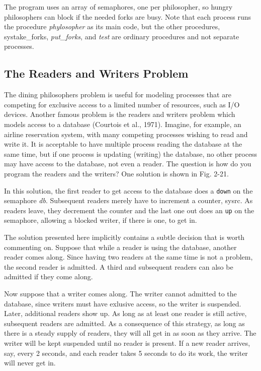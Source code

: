 \documentclass{book}
\newcommand {\sys} [1] {\textsl{#1}}
\newcommand {\cmd} [1] {\texttt{#1}}
\begin{document}
The program uses an array of semaphores, one per philosopher, so hungry philosophers can block if the needed forks are busy.
Note that each process runs the procedure \sys{phylosopher} as its main code, 
but the other procedures, sys{take\_forks}, \sys{put\_forks}, and \sys{test} are ordinary procedures and not separate processes.

\subsection{The Readers and Writers Problem}
The dining philosophers problem is useful for modeling processes that are competing for exclusive access to a limited number of resources,
such as I/O devices.
Another famous problem is the readers and writers problem which models access to a database (Courtois et al., 1971).
Imagine, for example, an airline reservation system, with many competing processes wishing to read and write it.
It is acceptable to have multiple process reading the database at the same time, but if one process is updating (writing) the database,
no other process may have access to the database, not even a reader.
The question is how do you program the readers and the writers?
One solution is shown in Fig. 2-21.

In this solution, the first reader to get access to the database does a \cmd{down} on the semaphore \sys{db}.
Subsequent readers merely have to increment a counter, sys{rc}.
As readers leave, they decrement the counter and the last one out does an \cmd{up} on the semaphore, allowing a blocked writer,
if there is one, to get in.

The solution presented here implicitly contains a subtle decision that is worth commenting on.
Suppose that while a reader is using the database, another reader comes along.
Since having two readers at the same time is not a problem, the second reader is admitted.
A third and subsequent readers can also be admitted if they come along.

Now suppose that a writer comes along.
The writer cannot admitted to the database, since writers must have exlusive access, so the writer is suspended.
Later, additional readers show up.
As long as at least one reader is still active, subsequent readers are admitted.
As a consequence of this strategy, as long as there is a steady supply of readers, they will all get in as soon as they arrive.
The writer will be kept suspended until no reader is present.
If a new reader arrives, say, every 2 seconds, and each reader takes 5 seconds to do its work, the writer will never get in.
\end{document}
